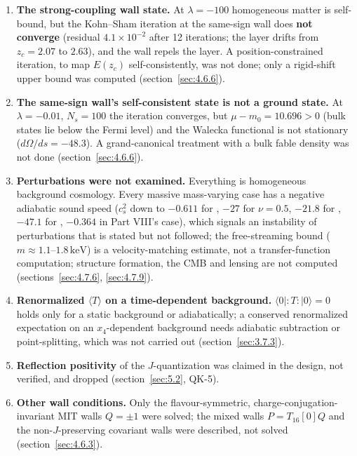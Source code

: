 \begin{enumerate}
  \item \textbf{The strong-coupling wall state.} At $\lambda = -100$ homogeneous matter is self-bound, but the Kohn--Sham iteration at the same-sign wall does \textbf{not converge} (residual $4.1\times10^{-2}$ after 12 iterations; the layer drifts from $z_c = 2.07$ to $2.63$), and the wall repels the layer. A position-constrained iteration, to map $E(z_c)$ self-consistently, was not done; only a rigid-shift upper bound was computed (section~\ref{sec:4.6.6}).
  \item \textbf{The same-sign wall's self-consistent state is not a ground state.} At $\lambda = -0.01$, $N_s = 100$ the iteration converges, but $\mu - m_0 = 10.696 > 0$ (bulk states lie below the Fermi level) and the Walecka functional is not stationary ($d\Omega/ds=-48.3$). A grand-canonical treatment with a bulk fable density was not done (section~\ref{sec:4.6.6}).
  \item \textbf{Perturbations were not examined.} Everything is homogeneous background cosmology. Every massive mass-varying case has a negative adiabatic sound speed ($c_s^{2}$ down to $-0.611$ for , $-27$ for $\nu = 0.5$, $-21.8$ for , $-47.1$ for , $-0.364$ in Part VIII's case), which signals an instability of perturbations that is stated but not followed; the free-streaming bound ($m\approx1.1\text{--}1.8\,\mathrm{keV}$) is a velocity-matching estimate, not a transfer-function computation; structure formation, the CMB and lensing are not computed (sections~\ref{sec:4.7.6}, \ref{sec:4.7.9}).
  \item \textbf{Renormalized $\langle T\rangle$ on a time-dependent background.} $\langle0|{:}T{:}|0\rangle=0$ holds only for a static background or adiabatically; a conserved renormalized expectation on an $x_{4}$-dependent background needs adiabatic subtraction or point-splitting, which was not carried out (section~\ref{sec:3.7.3}).
  \item \textbf{Reflection positivity} of the $J$-quantization was claimed in the design, not verified, and dropped (section~\ref{sec:5.2}, QK-5).
  \item \textbf{Other wall conditions.} Only the flavour-symmetric, charge-conjugation-invariant MIT walls $Q = \pm 1$ were solved; the mixed walls $P = T_{16}[0] Q$ and the non-$J$-preserving covariant walls were described, not solved (section~\ref{sec:4.6.3}).
\end{enumerate}

